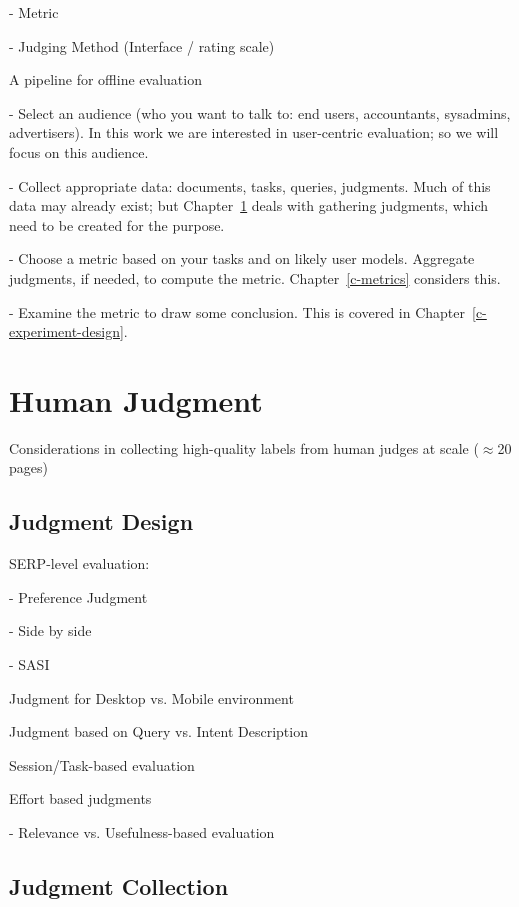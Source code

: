 \documentclass[openany]{now} %
\newcommand{\newpar}{\bigskip\noindent}
\begin{document}
-	Metric

-	Judging Method (Interface / rating scale) 

\newpar
A pipeline for offline evaluation

- Select an audience (who you want to talk to: end users, accountants, sysadmins, advertisers). In this work we are interested in user-centric evaluation; so we will focus on this audience.

- Collect appropriate data: documents, tasks, queries, judgments. Much of this data may already exist; but Chapter~\ref{c-human-judgment} deals with gathering judgments, which need to be created for the purpose.

- Choose a metric based on your tasks and on likely user models. Aggregate judgments, if needed, to compute the metric. Chapter~\ref{c-metrics} considers this.

- Examine the metric to draw some conclusion. This is covered in Chapter~\ref{c-experiment-design}.

\chapter{Human Judgment}
\label{c-human-judgment}
Considerations in collecting high-quality labels from human judges at scale (\ensuremath{\approx}20 pages)

\section{Judgment Design}

SERP-level evaluation: 

- Preference Judgment  \cite{Chandar2013} \cite{CarteretteBCD08}

- Side by side \cite{Thomas2006} \cite{Kim:2013}

- SASI \cite{Bailey2010} 

\newpar
Judgment for Desktop vs. Mobile environment \cite{Verma:2016:CRMD}

\newpar
Judgment based on Query vs. Intent Description \cite{Yilmaz:2014:EID}

\newpar
Session/Task-based evaluation \cite{Moraveji:2011} \cite{Xu:2009}

\newpar
Effort based judgments \cite{Yilmaz:2014} \cite{Verma:2016:EBJ}

- Relevance vs. Usefulness-based evaluation 

\section{Judgment Collection}
\end{document}
